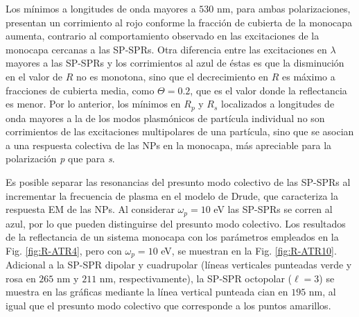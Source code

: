 Los mínimos a longitudes de onda mayores a $530$ nm, para ambas polarizaciones, presentan un corrimiento al rojo conforme la fracción de cubierta de la monocapa aumenta, contrario al comportamiento observado en las excitaciones de la monocapa cercanas a las SP-SPRs. Otra diferencia entre las excitaciones en $\lambda$ mayores a las SP-SPRs y los corrimientos al azul de éstas es que la disminución en el valor de $R$ no es monotona, sino que el decrecimiento en $R$ es máximo a fracciones de cubierta media, como $\Theta=0.2$, que es el valor donde la reflectancia es menor. Por lo anterior, los mínimos en $R_p$ y $R_s$ localizados a longitudes de onda mayores a la de los modos plasmónicos de partícula individual no son corrimientos de las excitaciones multipolares de una partícula, sino que se asocian a una respuesta colectiva de las NPs en la monocapa, más apreciable para la polarización \emph{p} que para \emph{s}.

Es posible separar las resonancias del presunto modo colectivo de las SP-SPRs al incrementar la frecuencia de plasma en el modelo de Drude, que caracteriza la respuesta EM de las NPs. Al considerar $\omega_p = 10$ eV las SP-SPRs se corren al azul, por lo que pueden distinguirse del presunto modo colectivo. Los resultados de la reflectancia de un sistema monocapa con los parámetros empleados en la Fig. \ref{fig:R-ATR4}, pero con $\omega_p = 10$ eV, se muestran en la Fig. \ref{fig:R-ATR10}. Adicional a la SP-SPR dipolar y cuadrupolar (líneas verticales punteadas verde y rosa en $265$ nm y $211$ nm, respectivamente), la SP-SPR octopolar ($\ell = 3$) se muestra en las gráficas mediante la línea vertical punteada cian en $195$ nm, al igual que el presunto modo colectivo que corresponde a los puntos amarillos.
	
